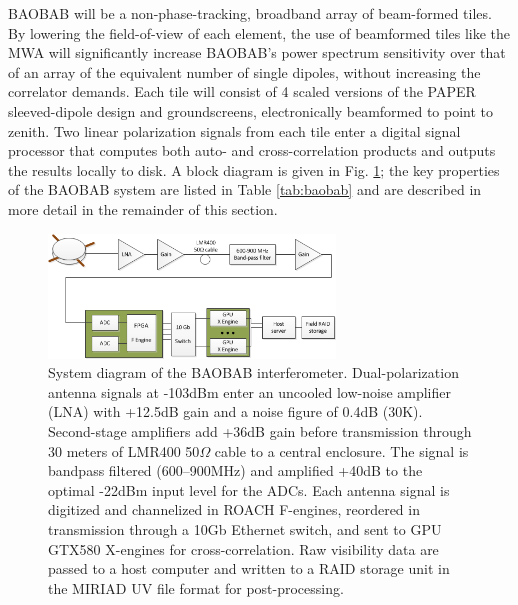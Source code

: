 \documentclass[10pt,iop]{emulateapj}
\begin{document}
BAOBAB will be a non-phase-tracking, broadband array of beam-formed tiles.
By lowering the field-of-view of each element,  
the use of beamformed tiles like the MWA will significantly increase BAOBAB's power spectrum sensitivity
over that of an array of the equivalent number of single dipoles, without increasing the correlator demands.
Each tile will consist of 4 scaled versions of the PAPER sleeved-dipole design 
and groundscreens, electronically beamformed to point to zenith.
Two linear polarization signals
from each tile enter a digital signal processor that computes both auto-
and cross-correlation products and outputs the results locally to disk.
A block diagram is given in Fig. \ref{fig:signal_flow}; 
the key properties of the BAOBAB system are listed in Table \ref{tab:baobab}
and are described in more detail in the remainder of this section.

\begin{figure}\centering
\includegraphics[width=3in]{signal_flow.png}
\caption{
System diagram of the BAOBAB interferometer.  Dual-polarization antenna signals
at -103dBm enter an uncooled low-noise amplifier (LNA) with +12.5dB
gain and a noise figure of 0.4dB (30K).  Second-stage amplifiers add
+36dB gain before transmission through 30 meters of LMR400 50$\Omega$ cable to
a central enclosure.  The signal is bandpass filtered (600--900MHz) and
amplified +40dB to the optimal -22dBm input level for the ADCs.
Each antenna signal is digitized and channelized in ROACH F-engines, reordered
in transmission through 
a 10Gb Ethernet switch, and sent to GPU GTX580 X-engines
for cross-correlation. Raw visibility data are passed to a host
computer and written to a RAID storage unit in the MIRIAD UV file format
for post-processing.
}
\label{fig:signal_flow}
\end{figure}
\end{document}

